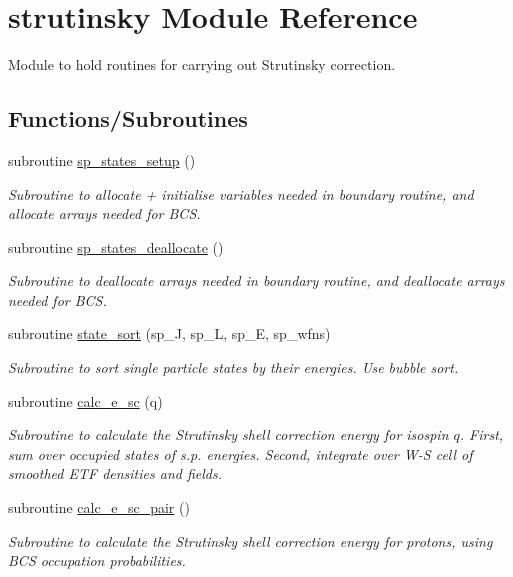 \hypertarget{namespacestrutinsky}{}\section{strutinsky Module Reference}
\label{namespacestrutinsky}


Module to hold routines for carrying out Strutinsky correction.  


\subsection*{Functions/\+Subroutines}
\begin{DoxyCompactItemize}
\item 
subroutine \mbox{\hyperlink{namespacestrutinsky_a6eeba7570095328226f37df3e89b7a18}{sp\+\_\+states\+\_\+setup}} ()
\begin{DoxyCompactList}\small\item\em Subroutine to allocate + initialise variables needed in \textquotesingle{}boundary\textquotesingle{} routine, and allocate arrays needed for B\+CS. \end{DoxyCompactList}\item 
subroutine \mbox{\hyperlink{namespacestrutinsky_a0a07c6adfd14cbf345bf96b70d3f5d82}{sp\+\_\+states\+\_\+deallocate}} ()
\begin{DoxyCompactList}\small\item\em Subroutine to deallocate arrays needed in \textquotesingle{}boundary\textquotesingle{} routine, and deallocate arrays needed for B\+CS. \end{DoxyCompactList}\item 
subroutine \mbox{\hyperlink{namespacestrutinsky_a106e8ec285383b5042e8436a2376147a}{state\+\_\+sort}} (sp\+\_\+J, sp\+\_\+L, sp\+\_\+E, sp\+\_\+wfns)
\begin{DoxyCompactList}\small\item\em Subroutine to sort single particle states by their energies. Use bubble sort. \end{DoxyCompactList}\item 
subroutine \mbox{\hyperlink{namespacestrutinsky_a7a348b225e6556c53687ee28ee31b316}{calc\+\_\+e\+\_\+sc}} (q)
\begin{DoxyCompactList}\small\item\em Subroutine to calculate the Strutinsky shell correction energy for isospin $q$. First, sum over occupied states of s.\+p. energies. Second, integrate over W-\/S cell of smoothed E\+TF densities and fields. \end{DoxyCompactList}\item 
subroutine \mbox{\hyperlink{namespacestrutinsky_a2cc0d4130d68c345ffe3ffa73706e796}{calc\+\_\+e\+\_\+sc\+\_\+pair}} ()
\begin{DoxyCompactList}\small\item\em Subroutine to calculate the Strutinsky shell correction energy for protons, using B\+CS occupation probabilities. \end{DoxyCompactList}\end{DoxyCompactItemize}


